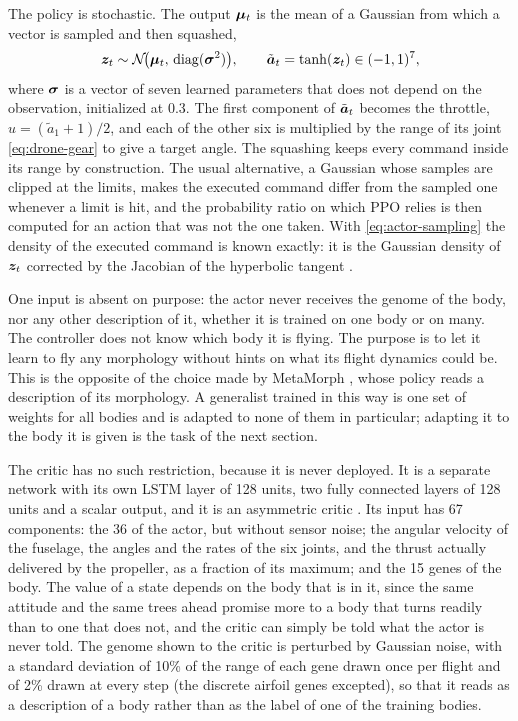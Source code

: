 The policy is stochastic. The output $\bm{\mu}_t$ is the mean of a Gaussian from which a vector is sampled and then squashed,
\begin{equation}
\bm{z}_t \sim \mathcal{N}\!\big(\bm{\mu}_t,\, \operatorname{diag}(\bm{\sigma}^2)\big), \qquad \tilde{\bm{a}}_t = \tanh(\bm{z}_t) \in (-1, 1)^7,
\label{eq:actor-sampling}
\end{equation}
where $\bm{\sigma}$ is a vector of seven learned parameters that does not depend on the observation, initialized at 0.3. The first component of $\tilde{\bm{a}}_t$ becomes the throttle, $u = (\tilde{a}_1 + 1)/2$, and each of the other six is multiplied by the range of its joint \eqref{eq:drone-gear} to give a target angle. The squashing keeps every command inside its range by construction. The usual alternative, a Gaussian whose samples are clipped at the limits, makes the executed command differ from the sampled one whenever a limit is hit, and the probability ratio on which PPO relies is then computed for an action that was not the one taken. With \eqref{eq:actor-sampling} the density of the executed command is known exactly: it is the Gaussian density of $\bm{z}_t$ corrected by the Jacobian of the hyperbolic tangent \cite{haarnoja2018soft}.

One input is absent on purpose: the actor never receives the genome of the body, nor any other description of it, whether it is trained on one body or on many. The controller does not know which body it is flying. The purpose is to let it learn to fly any morphology without hints on what its flight dynamics could be. This is the opposite of the choice made by MetaMorph \cite{gupta2022metamorph}, whose policy reads a description of its morphology. A generalist trained in this way is one set of weights for all bodies and is adapted to none of them in particular; adapting it to the body it is given is the task of the next section.

The critic has no such restriction, because it is never deployed. It is a separate network with its own LSTM layer of 128 units, two fully connected layers of 128 units and a scalar output, and it is an asymmetric critic \cite{pinto2018asymmetric}. Its input has 67 components: the 36 of the actor, but without sensor noise; the angular velocity of the fuselage, the angles and the rates of the six joints, and the thrust actually delivered by the propeller, as a fraction of its maximum; and the 15 genes of the body. The value of a state depends on the body that is in it, since the same attitude and the same trees ahead promise more to a body that turns readily than to one that does not, and the critic can simply be told what the actor is never told. The genome shown to the critic is perturbed by Gaussian noise, with a standard deviation of 10\% of the range of each gene drawn once per flight and of 2\% drawn at every step (the discrete airfoil genes excepted), so that it reads as a description of a body rather than as the label of one of the training bodies.

